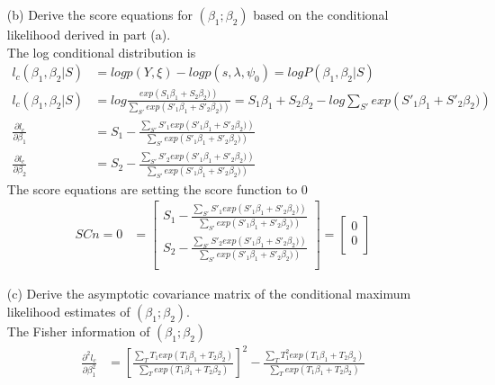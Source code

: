 \documentclass[11pt]{article} %
\begin{document}
\begin{itemize}
	\item[(b)] Derive the score equations for $(\beta_1; \beta_2)$ based on the conditional likelihood derived in part (a).\\
	The log conditional distribution is
	\begin{align*}
		l_c(\beta_1, \beta_2| S) &= log p(Y, \xi) - log p(s,\lambda, \psi_0) =log  P(\beta_1, \beta_2| S)\\
		l_c(\beta_1, \beta_2| S) &= log \frac{exp \left(S_1\beta_1 + S_2 \beta_2) \right)}{\sum_{S'} exp \left( S'_1\beta_1 + S'_2\beta_2)\right)} = S_1\beta_1 + S_2 \beta_2 - log \sum_{S'} exp \left( S'_1\beta_1 + S'_2\beta_2)\right)\\
		\frac{\partial l_c}{\partial \beta_1} &= S_1 - \frac{\sum_{S'} S'_1 exp \left( S'_1\beta_1 + S'_2\beta_2)\right)}{\sum_{S'} exp \left( S'_1\beta_1 + S'_2\beta_2)\right)} \\
		\frac{\partial l_c}{\partial \beta_2} &=S_2 - \frac{\sum_{S'} S'_2 exp \left( S'_1\beta_1 + S'_2\beta_2)\right)}{\sum_{S'} exp \left( S'_1\beta_1 + S'_2\beta_2)\right)} 
	\end{align*}  
	The score equations are setting the score function to 0
	\begin{align*}
		SCn = 0 &= \begin{bmatrix}
			S_1 - \frac{\sum_{S'} S'_1 exp \left( S'_1\beta_1 + S'_2\beta_2)\right)}{\sum_{S'} exp \left( S'_1\beta_1 + S'_2\beta_2)\right)}  \\
			S_2 - \frac{\sum_{S'} S'_2 exp \left( S'_1\beta_1 + S'_2\beta_2)\right)}{\sum_{S'} exp \left( S'_1\beta_1 + S'_2\beta_2)\right)}   \\
		\end{bmatrix} =\begin{bmatrix}
			0  \\
			0  \\
		\end{bmatrix}
	\end{align*}
	\item[(c)] Derive the asymptotic covariance matrix of the conditional maximum likelihood estimates of $(\beta_1; \beta_2)$.\\
	The Fisher information of $(\beta_1; \beta_2)$
	\begin{align*}
		\frac{\partial^2 l_c}{\partial \beta_1^2} &=  \left[\frac{\sum_{T} T_1 exp \left( T_1\beta_1 + T_2\beta_2\right)}{\sum_{T} exp \left( T_1\beta_1 + T_2\beta_2\right)} \right]^2 - \frac{\sum_{T} T_1^2 exp \left( T_1\beta_1 + T_2\beta_2\right)}{\sum_{T} exp \left( T_1\beta_1 + T_2\beta_2\right)}\\

\end{align*}
\end{itemize}
\end{document}
